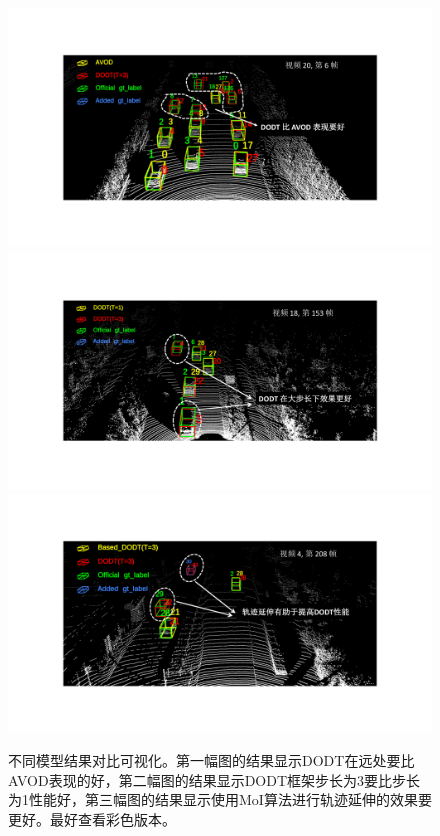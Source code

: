 \begin{figure}[!t]
	\centering
	\includegraphics[trim={4cm, 4cm, 5cm, 3.7cm}, clip, width=\textwidth]{./imgs/result_compare_01.pdf}
	\includegraphics[trim={4cm, 4cm, 5cm, 3.7cm}, clip, width=\textwidth]{./imgs/result_compare_02.pdf}
	\includegraphics[trim={4cm, 4cm, 5cm, 3.5cm}, clip, width=\textwidth]{./imgs/result_compare_03.pdf}
	\caption{不同模型结果对比可视化。第一幅图的结果显示DODT在远处要比AVOD表现的好，第二幅图的结果显示DODT框架步长为3要比步长为1性能好，第三幅图的结果显示使用MoI算法进行轨迹延伸的效果要更好。最好查看彩色版本。}
	\label{fig:result_compare}
\end{figure}
